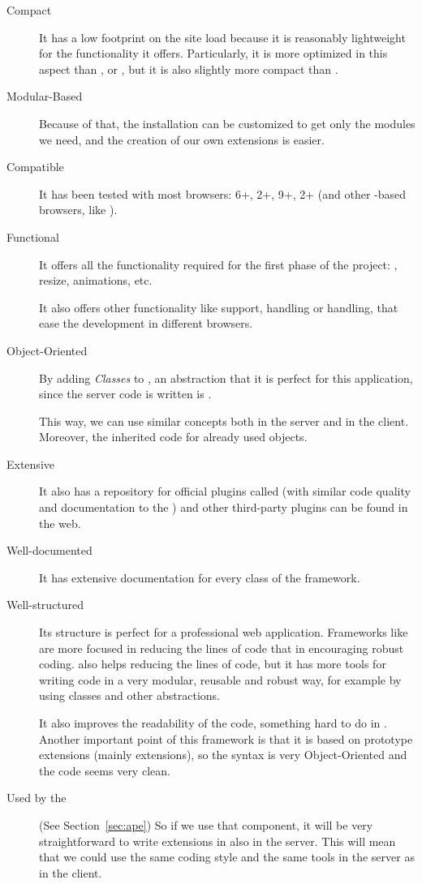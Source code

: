 \begin{description}
  \item[Compact] It has a low footprint on
the site load because it is reasonably lightweight for the functionality it
offers. Particularly, it is more optimized in this aspect than ,
 or , but it is also slightly more compact than
.
  \item[Modular-Based] Because of that, the installation can be customized to
get only the modules we need, and the creation of our own extensions is
easier.
  \item[Compatible] It has been tested with most browsers:
 6+,  2+,  9+,  2+
(and other -based browsers, like ).
  \item[Functional] It offers all the functionality required for the first phase
of the project: , resize, animations, etc.

It also offers other functionality like  support, 
handling or  handling, that ease the development in different
browsers.
  \item[Object-Oriented] By adding \emph{Classes} to , an
abstraction that it is perfect for this application, since the server code is
written is .

This way, we can use similar concepts both in the
server and in the client. Moreover, the inherited code for 
already used  objects.
  \item[Extensive] It also has a repository for official plugins called 
 (with similar code quality and documentation to the
) and other third-party plugins can be found in the web.
  \item[Well-documented] It has extensive documentation for every class of the 
framework.
  \item[Well-structured] Its structure is perfect for a professional web
application. Frameworks like  are more focused in reducing the 
lines of code that in encouraging robust coding.  also helps
reducing the lines of code, but it has more tools for writing code in a very
modular, reusable and robust way, for example by using classes and other
abstractions.

It also improves the readability of the code, something hard to do in
. Another important point of this framework is that it is
based on prototype extensions (mainly  extensions), so the syntax is
very Object-Oriented and the code seems very clean.
  \item[Used by the ] (See Section~\ref{sec:ape}) So if we use that component, it will be
very straightforward to write extensions in  also in the
server. This will mean that we could use the same coding style and the same
tools in the server as in the client.
\end{description}
